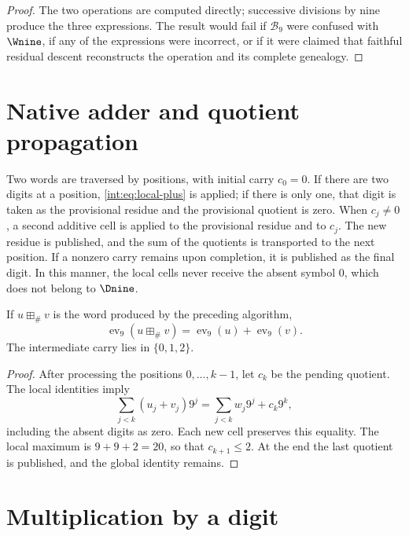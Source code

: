 \begin{proof}
The two operations are computed directly; successive divisions by
nine produce the three expressions. The result would fail if
\(\mathscr B_9\) were confused with \(\Wnine\), if any of the expressions were incorrect,
or if it were claimed that faithful residual descent reconstructs the operation and its
complete genealogy.
\end{proof}

\section{Native adder and quotient propagation}

\begin{algorithm}
Two words are traversed by positions, with initial carry \(c_0=0\). If there are
two digits at a position, \eqref{int:eq:local-plus} is applied; if there is only one,
that digit is taken as the provisional residue and the provisional quotient is zero.
When \(c_j\ne0\), a second additive cell is applied to the provisional residue
and to \(c_j\). The new residue is published, and the sum of the
quotients is transported to the next position. If a nonzero carry remains upon
completion, it is published as the final digit. In this manner, the local cells never receive the
absent symbol \(0\), which does not belong to \(\Dnine\).
\end{algorithm}

\begin{lemma}
If $u\boxplus_\#v$ is the word produced by the preceding algorithm,
\[
 \operatorname{ev}_9(u\boxplus_\#v)
 =\operatorname{ev}_9(u)+\operatorname{ev}_9(v).
\]
The intermediate carry lies in $\{0,1,2\}$.
\end{lemma}

\begin{proof}
After processing the positions $0,\ldots,k-1$, let $c_k$ be the pending quotient.
The local identities imply
\[
 \sum_{j<k}(u_j+v_j)9^j
 =\sum_{j<k}w_j9^j+c_k9^k,
\]
including the absent digits as zero. Each new cell preserves this
equality. The local maximum is $9+9+2=20$, so that $c_{k+1}\leq2$. At the
end the last quotient is published, and the global identity remains.
\end{proof}

\section{Multiplication by a digit}

